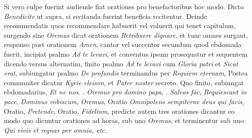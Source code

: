 \begin{multicols*}{2}
Si vero culpe fuerint audiende fiat orationes pro benefactoribus hoc modo. Dicto \textit{Benedicite} ut supra, si recitanda fuerint beneficia recitentur. Deinde recommendatis quos recommendare habuerit vel voluerit qui tenet capitulum, surgendo sine \textit{Oremus} dicat orationem \textit{Retribuere dignare}, et tunc omnes surgant, responso post orationem \textit{Amen}, cantor vel succentor secundum quod ebdomada fuerit, incipiat psalmo \textit{Ad te levavi}, et conventus ipsum prosequatur et sequentem dicendo versus alternatim, finito psalmo \textit{Ad te levavi} cum \textit{Gloria patri} et \textit{Sicut erat}, subiungatur psalmo \textit{De profundis} terminandus per \textit{Requiem eternam}, Postea communiter dicatur \textit{Kyrie eleison}, et \textit{Pater noster} secreto. Quo finito, subiungat ebdomadarius, \textit{Et ne nos}. \Vbar . \textit{Oremus pro domino papa}, \Vbar . \textit{Salvos fac}, \textit{Requiescant in pace}, \textit{Dominus vobiscum}, \textit{Oremus}, Oratio \textit{Omnipotens sempiterne deus qui facis}, Oratio, \textit{Pretende}, Oratio, \textit{Fidelium}, predicte autem tres orationes dicantur eo modo quo dicuntur orationes ad horas, sub uno \textit{Oremus}, et terminentur sub uno \textit{Qui vivis et regnas per omnia, etc.}









\end{multicols*}